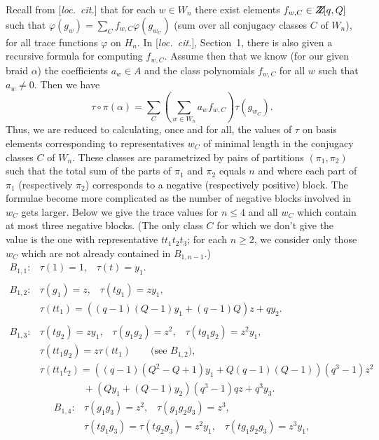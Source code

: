 \begin{exmp}
{Recall from [{\em loc.\ cit.}] that for each $w \in W_n$ 
there exist elements $f_{w,C} \in {\mbox{$Z\!\!\! Z\!$}}[q,Q]$ such that $\varphi(g_w)=
\sum_C f_{w,C} \varphi(g_{w_C})$ (sum over all conjugacy classes $C$ of
$W_n$), for all trace functions $\varphi$ on $H_n$. In [{\em loc.\ cit.}], 
Section~1, there is also given a recursive formula for computing $f_{w,C}$.  
Assume then that we know (for our given braid $\alpha$) the coefficients 
$a_w \in A$ and the class polynomials $f_{w,C}$ for all $w$ such that 
$a_w \neq 0$. Then we have
\[ \tau \circ \pi(\alpha)=\sum_C \left( \sum_{w \in W_n} a_wf_{w,C} 
\right) \tau(g_{w_C}).\]
Thus, we are reduced to calculating, once and for all, the values of
$\tau$ on basis elements corresponding to representatives $w_C$ 
of minimal length in the conjugacy classes $C$ of $W_n$. These classes
are parametrized by pairs of partitions $(\pi_1,\pi_2)$ such that the total sum
of the parts of $\pi_1$ and $\pi_2$ equals $n$ and where each part of $\pi_1$
(respectively $\pi_2$)  corresponds to a negative (respectively positive)
block. The formulae become more complicated as the number of negative blocks
involved in $w_C$ gets larger. Below we give the trace values for $n \leq 4$
and all $w_C$ which contain at most three negative blocks. (The only class 
$C$ for which we don't give the value is the one with representative 
$tt_1t_2t_3$; for each $n \geq 2$, we consider only those $w_C$ which are 
not already contained in $B_{1,n-1}$.) 
\[\begin{array}{cl}
B_{1,1}: & \tau(1)=1,\;\;\; \tau(t)=y_1.\\ & \\
B_{1,2}: & \tau(g_1)=z, \;\;\;\tau(tg_1)=zy_1,\\
& \tau(tt_1)=((q-1)(Q-1)y_1+(q-1)Q)z+qy_2.\\ & \\
B_{1,3}: & \tau(tg_2)=zy_1,\;\;\; \tau(g_1g_2)=z^2,\;\;\; 
\tau(tg_1g_2)=z^2y_1,\\
& \tau(tt_1g_2)=z\tau(tt_1) \;\;\;\;\;\; \mbox{ (see $B_{1,2}$)}, \\
& \tau(tt_1t_2)=((q-1)(Q^2-Q+1)y_1+Q(q-1)(Q-1))(q^3-1)z^2\\
& \;\;\;\;\;\;\;\;\;\;\;\;\;\;\;\; +(Qy_1+(Q-1)y_2)(q^3-1)qz+q^3y_3. 
\end{array}\]
\[\begin{array}{cl}
B_{1,4}: & \tau(g_1g_3)=z^2,\;\;\;\tau(g_1g_2g_3)=z^3,\\
& \tau(tg_1g_3)=\tau(tg_2g_3)=z^2y_1,\;\;\;
\tau(tg_1g_2g_3)=z^3y_1, \\

\end{array}\]}
\end{exmp}
